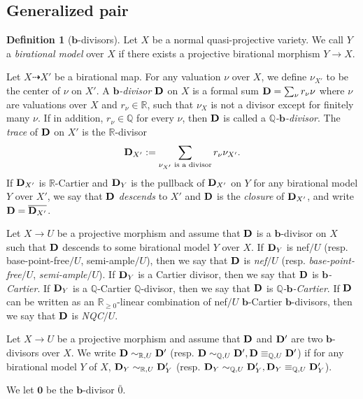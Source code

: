 \documentclass[11pt]{amsart}
\numberwithin{equation}{section}
\newcommand{\bb}{\bm{b}}
\newcommand{\Dd}{{\bf{D}}}
\newcommand{\Qq}{\mathbb{Q}}
\newcommand{\Rr}{\mathbb{R}}
\theoremstyle{definition}
\newtheorem{defn}[thm]{Definition}
\theoremstyle{definition}
\theoremstyle{definition}
\begin{document}
\subsection{Generalized pair}

\begin{defn}[$\mathbf{b}$-divisors]\label{defn: b divisors} Let $X$ be a normal quasi-projective variety. We call $Y$ a \emph{birational model} over $X$ if there exists a projective birational morphism $Y\to X$. 

Let $X\dashrightarrow X'$ be a birational map. For any valuation $\nu$ over $X$, we define $\nu_{X'}$ to be the center of $\nu$ on $X'$. A \emph{$\bb$-divisor} $\Dd$ on $X$ is a formal sum $\Dd=\sum_{\nu} r_{\nu}\nu$ where $\nu$ are valuations over $X$ and $r_{\nu}\in\mathbb R$, such that $\nu_X$ is not a divisor except for finitely many $\nu$. If in addition, $r_{\nu}\in\Qq$ for every $\nu$, then $\Dd$ is called a \emph{$\Qq$-$\bb$-divisor}. The \emph{trace} of $\Dd$ on $X'$ is the $\Rr$-divisor
$$\Dd_{X'}:=\sum_{\nu_{X'}\text{ is a divisor}}r_\nu\nu_{X'}.$$
If $\Dd_{X'}$ is $\Rr$-Cartier and $\Dd_{Y}$ is the pullback of $\Dd_{X'}$ on $Y$ for any birational model $Y$ over $X'$, we say that $\Dd$ \emph{descends} to $X'$ and $\Dd$ is the \emph{closure} of $\Dd_{X'}$, and write $\Dd=\overline{\Dd_{X'}}$. 

Let $X\rightarrow U$ be a projective morphism and assume that $\Dd$ is a $\bb$-divisor on $X$ such that $\Dd$ descends to some birational model $Y$ over $X$. If $\Dd_Y$ is nef$/U$ (resp. base-point-free$/U$, semi-ample$/U$), then we say that $\Dd$ is \emph{nef}$/U$ (resp. \emph{base-point-free}$/U$, \emph{semi-ample}$/U$). If $\Dd_Y$ is a Cartier divisor, then we say that $\Dd$ is \emph{$\bb$-Cartier}. If $\Dd_Y$ is a $\Qq$-Cartier $\Qq$-divisor, then we say that $\Dd$ is \emph{$\Qq$-$\bb$-Cartier}. If $\Dd$ can be written as an $\Rr_{\geq 0}$-linear combination of nef$/U$ $\bb$-Cartier $\bb$-divisors, then we say that $\Dd$ is \emph{NQC}$/U$.

Let $X\rightarrow U$ be a projective morphism and assume that $\Dd$ and $\Dd'$ are two $\bb$-divisors over $X$. We write $\Dd\sim_{\mathbb R,U}\Dd'$ (resp. $\Dd\sim_{\mathbb Q,U}\Dd',\Dd\equiv_{\mathbb Q,U}\Dd'$) if for any birational model $Y$ of $X$, $\Dd_Y\sim_{\mathbb R,U}\Dd'_Y$ (resp. $\Dd_Y\sim_{\mathbb Q,U}\Dd'_Y,\Dd_Y\equiv_{\mathbb Q,U}\Dd_Y'$). 

We let $\bm{0}$ be the $\bb$-divisor $\bar{0}$.
\end{defn}
\end{document}
